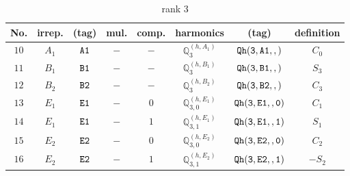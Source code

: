 \documentclass[fleqn,8pt]{jsarticle}
\begin{document}
\begin{table}[ht!]
\begin{center}
\caption{rank 3}
\renewcommand{\arraystretch}{1.3}
\begin{tabular}{cccccccc} \hline \hline
No. & irrep. & (tag) & mul. & comp. & harmonics & (tag) & definition \\ \hline
$ 10 $ & $ A_{1} $ & $ {\tt A1} $ & $ - $ & $ - $ & $ \mathbb{Q}_{3}^{(h,A_{1})} $ & $ {\tt Qh(3,A1,,)} $ & $ C_{0} $ \\
$ 11 $ & $ B_{1} $ & $ {\tt B1} $ & $ - $ & $ - $ & $ \mathbb{Q}_{3}^{(h,B_{1})} $ & $ {\tt Qh(3,B1,,)} $ & $ S_{3} $ \\
$ 12 $ & $ B_{2} $ & $ {\tt B2} $ & $ - $ & $ - $ & $ \mathbb{Q}_{3}^{(h,B_{2})} $ & $ {\tt Qh(3,B2,,)} $ & $ C_{3} $ \\
$ 13 $ & $ E_{1} $ & $ {\tt E1} $ & $ - $ & $ 0 $ & $ \mathbb{Q}_{3,0}^{(h,E_{1})} $ & $ {\tt Qh(3,E1,,0)} $ & $ C_{1} $ \\
$ 14 $ & $ E_{1} $ & $ {\tt E1} $ & $ - $ & $ 1 $ & $ \mathbb{Q}_{3,1}^{(h,E_{1})} $ & $ {\tt Qh(3,E1,,1)} $ & $ S_{1} $ \\
$ 15 $ & $ E_{2} $ & $ {\tt E2} $ & $ - $ & $ 0 $ & $ \mathbb{Q}_{3,0}^{(h,E_{2})} $ & $ {\tt Qh(3,E2,,0)} $ & $ C_{2} $ \\
$ 16 $ & $ E_{2} $ & $ {\tt E2} $ & $ - $ & $ 1 $ & $ \mathbb{Q}_{3,1}^{(h,E_{2})} $ & $ {\tt Qh(3,E2,,1)} $ & $ - S_{2} $ \\
 \hline \hline
\end{tabular}
\end{center}
\end{table}
\end{document}
